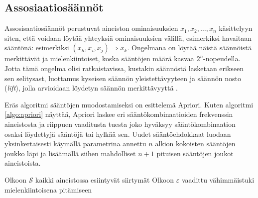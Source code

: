 \documentclass[finnish,gradu,twoside,12pt]{tktltiki}
\begin{document}
{%



\subsection{Assosiaatiosäännöt}

Assosisaatiosäännöt perustuvat aineiston ominaisuuksien $x_1, x_2, \ldots, x_n$ käsittelyyn siten, että voidaan löytää yhteyksiä ominaisuuksien välillä, esimerkiksi havaitaan sääntönä: esimerkiksi $(x_h, x_i, x_j) \Rightarrow x_k$. Ongelmana on löytää näistä säännöistä merkittävät ja mielenkiintoiset, koska sääntöjen määrä kasvaa $2^n$-nopeudella. Jotta tämä ongelma olisi ratkaistavissa, kustakin säännöstä lasketaan erikseen sen selitysast, luottamus kyseisen säännön yleistettävyyteen ja säännön nosto (\textit{lift}), jolla arvioidaan löydetyn säännön merkittävyyttä \citep[485--586]{Hastie2009}.

Eräs algoritmi sääntöjen muodostamiseksi on \citet{Agrawal1994a} esittelemä Apriori. Kuten algoritmi \ref{algo:apriori} näyttää, Apriori laskee eri sääntökombinaatioiden frekvenssin aineistosta ja riippuen vaaditusta tuesta joko hyväksyy sääntökombinaation osaksi löydettyjä sääntöjä tai hylkää sen. Uudet sääntöehdokkaat luodaan yksinkertaisesti käymällä parametrina annettu $n$ alkion kokoisten sääntöjen joukko läpi ja lisäämällä siihen mahdolliset $n+1$ pituisen sääntöjen joukot aineistoista.

\begin{algorithm}
\begin{algorithmic}
\State Olkoon $\mathcal{S}$ kaikki aineistossa esiintyvät siirtymät
\State Olkoon $\varepsilon$ vaadittu vähimmäistuki mielenkiintoisena pitämiseen


\end{algorithmic}
\end{algorithm}}
\end{document}
